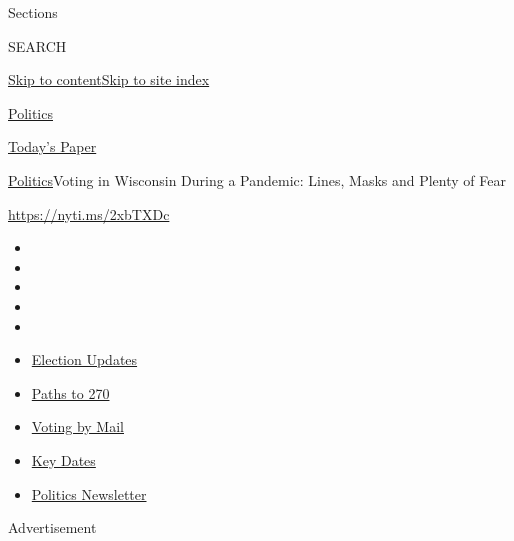 Sections

SEARCH

\protect\hyperlink{site-content}{Skip to
content}\protect\hyperlink{site-index}{Skip to site index}

\href{https://www.nytimes3xbfgragh.onion/section/politics}{Politics}

\href{https://myaccount.nytimes3xbfgragh.onion/auth/login?response_type=cookie\&client_id=vi}{}

\href{https://www.nytimes3xbfgragh.onion/section/todayspaper}{Today's
Paper}

\href{/section/politics}{Politics}\textbar{}Voting in Wisconsin During a
Pandemic: Lines, Masks and Plenty of Fear

\url{https://nyti.ms/2xbTXDc}

\begin{itemize}
\item
\item
\item
\item
\item
\end{itemize}

\begin{itemize}
\item
  \href{https://www.nytimes3xbfgragh.onion/live/2020/09/07/us/trump-vs-biden?action=click\&pgtype=Article\&state=default\&region=TOP_BANNER\&context=storylines_menu}{Election
  Updates}
\item
  \href{https://www.nytimes3xbfgragh.onion/interactive/2020/us/elections/election-states-biden-trump.html?action=click\&pgtype=Article\&state=default\&region=TOP_BANNER\&context=storylines_menu}{Paths
  to 270}
\item
  \href{https://www.nytimes3xbfgragh.onion/interactive/2020/08/31/us/politics/vote-by-mail-deadlines.html?action=click\&pgtype=Article\&state=default\&region=TOP_BANNER\&context=storylines_menu}{Voting
  by Mail}
\item
  \href{https://www.nytimes3xbfgragh.onion/interactive/2019/us/elections/2020-presidential-election-calendar.html?action=click\&pgtype=Article\&state=default\&region=TOP_BANNER\&context=storylines_menu}{Key
  Dates}
\item
  \href{https://www.nytimes3xbfgragh.onion/newsletters/politics?action=click\&pgtype=Article\&state=default\&region=TOP_BANNER\&context=storylines_menu}{Politics
  Newsletter}
\end{itemize}

Advertisement

